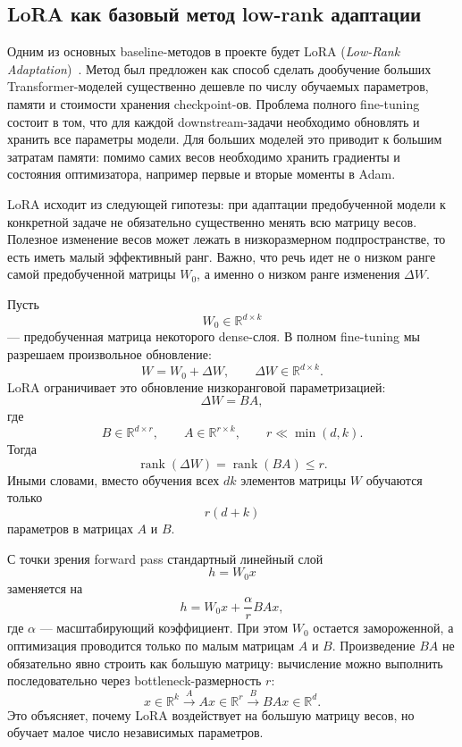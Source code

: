 \documentclass[]{scrartcl}
\begin{document}
\subsection{LoRA как базовый метод low-rank адаптации}

Одним из основных baseline-методов в проекте будет LoRA
(\textit{Low-Rank Adaptation})~\cite{hu2022lora}. Метод был предложен как способ сделать
дообучение больших Transformer-моделей существенно дешевле по числу обучаемых
параметров, памяти и стоимости хранения checkpoint-ов. Проблема полного
fine-tuning состоит в том, что для каждой downstream-задачи необходимо
обновлять и хранить все параметры модели. Для больших моделей это приводит к
большим затратам памяти: помимо самих весов необходимо хранить градиенты и
состояния оптимизатора, например первые и вторые моменты в Adam.

LoRA исходит из следующей гипотезы: при адаптации предобученной модели к
конкретной задаче не обязательно существенно менять всю матрицу весов. Полезное
изменение весов может лежать в низкоразмерном подпространстве, то есть иметь
малый эффективный ранг. Важно, что речь идет не о низком ранге самой
предобученной матрицы $W_0$, а именно о низком ранге изменения $\Delta W$.

Пусть
\[
    W_0 \in \mathbb{R}^{d \times k}
\]
--- предобученная матрица некоторого dense-слоя. В полном fine-tuning мы
разрешаем произвольное обновление:
\[
    W = W_0 + \Delta W,
    \qquad
    \Delta W \in \mathbb{R}^{d \times k}.
\]
LoRA ограничивает это обновление низкоранговой параметризацией:
\[
    \Delta W = BA,
\]
где
\[
    B \in \mathbb{R}^{d \times r},
    \qquad
    A \in \mathbb{R}^{r \times k},
    \qquad
    r \ll \min(d,k).
\]
Тогда
\[
    \operatorname{rank}(\Delta W)
    =
    \operatorname{rank}(BA)
    \leq r.
\]
Иными словами, вместо обучения всех $dk$ элементов матрицы $W$ обучаются только
\[
    r(d+k)
\]
параметров в матрицах $A$ и $B$.

С точки зрения forward pass стандартный линейный слой
\[
    h = W_0x
\]
заменяется на
\[
    h = W_0x + \frac{\alpha}{r}BAx,
\]
где $\alpha$ --- масштабирующий коэффициент. При этом $W_0$ остается
замороженной, а оптимизация проводится только по малым матрицам $A$ и $B$.
Произведение $BA$ не обязательно явно строить как большую матрицу: вычисление
можно выполнить последовательно через bottleneck-размерность $r$:
\[
    x \in \mathbb{R}^{k}
    \xrightarrow{\;A\;}
    Ax \in \mathbb{R}^{r}
    \xrightarrow{\;B\;}
    BAx \in \mathbb{R}^{d}.
\]
Это объясняет, почему LoRA воздействует на большую матрицу весов, но обучает
малое число независимых параметров.
\end{document}
